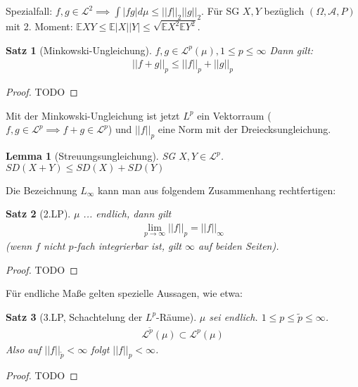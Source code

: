 \documentclass[]{article}
\newtheorem{theorem}{Satz}
\newtheorem{lemma}{Lemma}
\begin{document}
Spezialfall: $f,g \in \mathcal{L}^2 \implies \int |fg| d\mu \leq ||f||_2 ||g||_2$.
Für SG $X,Y$ bezüglich $(\Omega, \mathcal{A}, P)$ mit 2. Moment: $\mathbb{E}XY \leq \mathbb{E}|X||Y| \leq \sqrt{\mathbb{E}X^2 \mathbb{E}Y^2}$.

\begin{theorem}[Minkowski-Ungleichung]
	$f,g \in \mathcal{L}^p(\mu), 1 \leq p \leq \infty$ Dann gilt:
	\begin{align*}
		||f+g||_p \leq ||f||_p + ||g||_p
	\end{align*}
\end{theorem}
\begin{proof}
	TODO
\end{proof}

Mit der Minkowski-Ungleichung ist jetzt $L^p$ ein Vektorraum ($f,g \in \mathcal{L}^p \implies f+g\in \mathcal{L}^p$) und $||f||_p$ eine Norm mit der Dreiecksungleichung.

\begin{lemma}[Streuungsungleichung]
	SG $X,Y \in \mathcal{L}^p$. $SD(X+Y) \leq SD(X) + SD(Y)$
\end{lemma}

Die Bezeichnung $L_\infty$ kann man aus folgendem Zusammenhang rechtfertigen:

\begin{theorem}[2.LP]
	$\mu$ ... endlich, dann gilt
	\begin{align*}
		\lim\limits_{p\rightarrow\infty} ||f||_p = ||f||_\infty
	\end{align*}
	(wenn $f$ nicht $p$-fach integrierbar ist, gilt $\infty$ auf beiden Seiten).
\end{theorem}

\begin{proof}
	TODO
\end{proof}

Für endliche Maße gelten spezielle Aussagen, wie etwa:

\begin{theorem}[3.LP, Schachtelung der $L^p$-Räume]
	$\mu$ sei endlich. $1\leq p \leq \tilde{p} \leq \infty$.
	\begin{align*}
		\mathcal{L}^{\tilde{p}}(\mu) \subset \mathcal{L}^p(\mu)
	\end{align*}
	Also auf $||f||_{\tilde{p}} < \infty$ folgt $||f||_p < \infty$.
\end{theorem}

\begin{proof}
	TODO
\end{proof}
\end{document}
